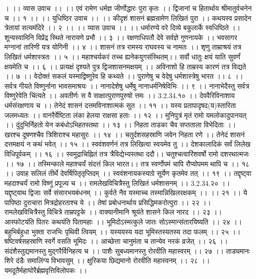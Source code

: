 । ।। व्यास उवाच ।। ।।
एवं रामेण धर्मज्ञ जीर्णोद्धारः पुरा कृतः ।।
द्विजानां च हितार्थाय श्रीमातुर्वचनेन च ।। १ ।।
।। युधिष्ठिर उवाच ।। ।।
कीदृशं शासनं ब्रह्मन्रामेण लिखितं पुरा ।।
कथयस्व प्रसादेन त्रेतायां सत्यमंदिरे ।। २ ।।
।। व्यास उवाच ।। ।।
धर्मारण्ये वरे दिव्ये बकुलार्के स्वधिष्ठिते ।।
शून्यस्वामिनि विप्रेंद्र स्थिते नारायणे प्रभौ ।। ३ ।।
रक्षणाधिपतौ देवे सर्वज्ञे गुणनायके ।।
भवसागर मग्नानां तारिणी यत्र योगिनी ।। ४ ।।
शासनं तत्र रामस्य राघवस्य च नामतः ।।
शृणु ताम्राश्रयं तत्र लिखितं धर्मशास्त्रतः ।। ५ ।।
महाश्चर्यकरं तच्च ह्यनेकयुगसंस्थितम्।।
सर्वो धातुः क्षयं याति सुवर्णं क्षयमेति च ।। ६ ।।
प्रत्यक्षं दृश्यते पुत्र द्विजशासनमक्षयम् ।।
अविनाशो हि ताम्रस्य कारणं तत्र विद्यते ।। ७ ।।
वेदोक्तं सकलं यस्माद्विष्णुरेव हि कथ्यते ।।
पुराणेषु च वेदेषु धर्मशास्त्रेषु भारत ।। ८ ।।
सर्वत्र गीयते विष्णुर्नाना भावसमाश्रयः ।।
नानादेशेषु धर्मेषु नानाधर्मनिषेविभिः ।। ९ ।।
नानाभेदैस्तु सर्वत्र विष्णुरेवेति चिंत्यते ।।
अवतीर्णः स वै साक्षात्पुराणपुरुषो त्तमः ।। 3.2.34.१० ।।
देववैरिविनाशाय धर्मसंरक्षणाय च ।।
तेनेदं शासनं दत्तमविनाशात्मकं सुत ।। ११ ।।
यस्य प्रतापादृषद(य)स्तारिता जलमध्यतः ।।
वानरैर्वेष्टिता लंका हेलया राक्षसा हताः ।। १२ ।।
मुनिपुत्रं मृतं रामो यमलोकादुपानयत् ।।
दुंदुभिर्निहतो येन कबंधोऽभिहतस्तथा ।। १३ ।।
निहता ताडका चैव सप्तताला विभेदिताः ।।
खरश्च दूषणश्चैव त्रिशिराश्च महासुरः ।। १४ ।।
चतुर्दशसहस्राणि जवेन निहता रणे ।।
तेनेदं शासनं दत्तमक्षयं न कथं भवेत् ।। १५ ।।
स्ववंशवर्णनं तत्र लिखित्वा स्वयमेव तु ।।
देशकालादिकं सर्वं लिलेख विधिपूर्वकम् ।। १६ ।।
स्वमुद्राचिह्नितं तत्र त्रैविद्येभ्यस्तथा ददौ।।
चतुश्चत्वारिंशवर्षो रामो दशरथात्मजः ।। १७ ।।
तस्मिन्काले महाश्चर्यं संदत्तं किल भारत।।
तत्र स्वर्णोपमं चापि रौप्योपमम थापि च ।। १८ ।।
उवाह सलिलं तीर्थे देवर्षिपितृतृप्तिदम् ।।
स्ववंशनायकस्याग्रे सूर्येण कृतमेव तत् ।। १९ ।।
तद्दृष्ट्वा महदाश्चर्यं रामो विष्णुं प्रपूज्य च ।।
रामलेखविचित्रैस्तु लिखितं धर्मशासनम् ।। 3.2.34.२० ।।
यद्दृष्ट्वाथ द्विजाः सर्वे संसारभयबंधनम् ।।
कुर्वते नैव यस्माच्च तस्मान्निखिलरक्षकम् ।। ।। २१ ।।
ये पापिष्ठा दुराचारा मित्रद्रोहरताश्च ये ।।
तेषां प्रबोधनार्थाय प्रसिद्धिमकरोत्पुरा ।। २२ ।।
रामलेखविचित्रैस्तु विचित्रे ताम्रपट्टके ।।
वाक्यानीमानि श्रूयंते शासने किल नारद ।। २३ ।।
आस्फोटयंति पितरः कथयंति पितामहाः ।।
भूमिदोऽस्मत्कुले जातः सोऽस्मान्संतारयिष्यति ।। २४ ।।
बहुभिर्बहुधा भुक्ता राजभिः पृथिवी त्वियम् ।।
यस्ययस्य यदा भूमिस्तस्यतस्य तदा फलम् ।। २५ ।।
षष्टिवर्षसहस्राणि स्वर्गे वसति भूमिदः ।।
आच्छेत्ता चानुमंता च तान्येव नरकं व्रजेत् ।। २६ ।।
संदंशैस्तुद्यमानस्तु मुद्गरैर्विनिहत्य च ।।
पाशैः सुबध्यमानस्तु रोरवीति महास्वरम् ।। २७ ।।
ताड्यमानः शिरे दंडैः समालिंग्य विभावसुम् ।।
क्षुरिकया छिद्यमानो रोरवीति महास्वनम् ।। २८ ।।
यमदूतैर्महाघोरैर्ब्रह्मवृत्तिविलोपकः ।।
